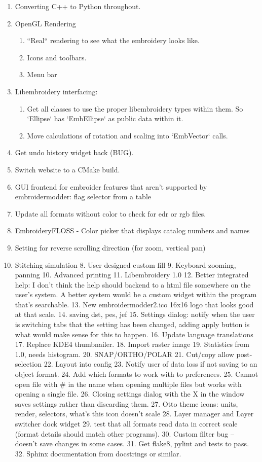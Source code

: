 \documentclass[a4paper, 11pt]{report}
\begin{document}
\begin{enumerate}
\item Converting C++ to Python throughout.
\item OpenGL Rendering
\begin{enumerate}
\item ``Real`` rendering to see what the embroidery looks like.
\item Icons and toolbars.
\item Menu bar
\end{enumerate}
\item Libembroidery interfacing:
\begin{enumerate}
\item Get all classes to use the proper libembroidery types within them.
       So `Ellipse` has `EmbEllipse` as public data within it.
\item Move calculations of rotation and scaling into `EmbVector` calls.
\end{enumerate}
\item Get undo history widget back (BUG).
\item Switch website to a CMake build.
\item GUI frontend for embroider features that aren't supported by embroidermodder: flag selector from a table
\item Update all formats without color to check for edr or rgb files.
\item EmbroideryFLOSS - Color picker that displays catalog numbers and names
\item Setting for reverse scrolling direction (for zoom, vertical pan)
\item Stitching simulation
8. User designed custom fill
9. Keyboard zooming, panning
10. Advanced printing
11. Libembroidery 1.0
12. Better integrated help: I don't think the help should backend to a html file somewhere on the user's system. A better system would be a custom widget within the program that's searchable.
13. New embroidermodder2.ico 16x16 logo that looks good at that scale.
14. saving dst, pes, jef
15. Settings dialog: notify when the user is switching tabs that the setting has been changed, adding apply button is what would make sense for this to happen.
16. Update language translations
17. Replace KDE4 thumbnailer.
18. Import raster image
19. Statistics from 1.0, needs histogram.
20. SNAP/ORTHO/POLAR
21. Cut/copy allow post-selection
22. Layout into config
23. Notify user of data loss if not saving to an object format.
24. Add which formats to work with to preferences.
25. Cannot open file with \# in the name when opening multiple files but works with opening a single file.
26. Closing settings dialog with the X in the window saves settings rather than discarding them.
27. Otto theme icons: units, render, selectors, what's this icon doesn't scale
28. Layer manager and Layer switcher dock widget
29. test that all formats read data in correct scale (format details should match other programs).
30. Custom filter bug -- doesn't save changes in some cases.
31. Get flake8, pylint and tests to pass.
32. Sphinx documentation from docstrings or similar.
\end{enumerate}
\end{document}
